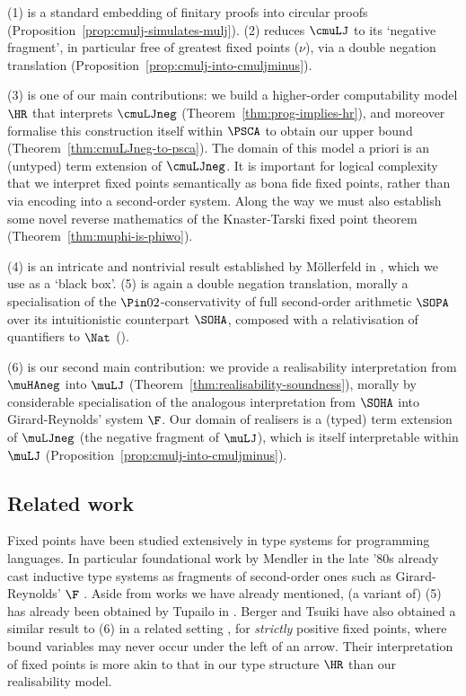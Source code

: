 (1) is a standard embedding of finitary proofs into circular proofs (Proposition~\ref{prop:cmulj-simulates-mulj}).
(2) reduces $\cmuLJ$ to its `negative fragment', in particular free of greatest fixed points ($\nu$), via a double negation translation (Proposition~\ref{prop:cmulj-into-cmuljminus}). 


(3) is one of our main contributions: we build a higher-order computability model $\HR$ that interprets $\cmuLJneg$ (Theorem~\ref{thm:prog-implies-hr}), and moreover formalise this construction itself within $\PSCA$ to obtain our upper bound (Theorem~\ref{thm:cmuLJneg-to-psca}).
The domain of this model a priori is an (untyped) term extension of $\cmuLJneg$.
It is important for logical complexity that we interpret fixed points semantically as bona fide fixed points, rather than via encoding into a second-order system.
Along the way we must also establish some novel reverse mathematics of the Knaster-Tarski fixed point theorem (Theorem~\ref{thm:muphi-is-phiwo}).

(4) is an intricate and nontrivial result established by M\"ollerfeld in \cite{Moellerfeld02:phd-thesis}, which we use as a `black box'.
(5) is again a double negation translation, morally a specialisation of the $\Pin 0 2 $-conservativity of full second-order arithmetic $\SOPA$ over its intuitionistic counterpart $\SOHA$, composed with a relativisation of quantifiers to $\Nat$ (). 

(6) is our second main contribution: we provide a realisability interpretation from $\muHAneg$ into $\muLJ$ (Theorem~\ref{thm:realisability-soundness}), morally by considerable specialisation of the analogous interpretation from $\SOHA$ into Girard-Reynolds' system $\F$.
Our domain of realisers is a (typed) term extension of $\muLJneg$ (the negative fragment of $\muLJ$), which is itself interpretable within $\muLJ$ (Proposition~\ref{prop:cmulj-into-cmuljminus}).




\subsection{Related work}
Fixed points have been studied extensively in type systems for programming languages.
In particular foundational work by Mendler in the late '80s \cite{Mendler87:recursive-types,Mendler91:inductive-types} already cast inductive type systems as fragments of second-order ones such as Girard-Reynolds' $\F$ \cite{girard1972systemF,Reynolds74systemF}.
Aside from works we have already mentioned, (a variant of) (5) has already been obtained by Tupailo in \cite{Tupailo04doubleneg}.
Berger and Tsuiki have also obtained a similar result to (6) in a related setting \cite{BerTsu21:ifp}, for \emph{strictly} positive fixed points, where bound variables may never occur under the left of an arrow. 
Their interpretation of fixed points is more akin to that in our type structure $\HR$ than our realisability model.

